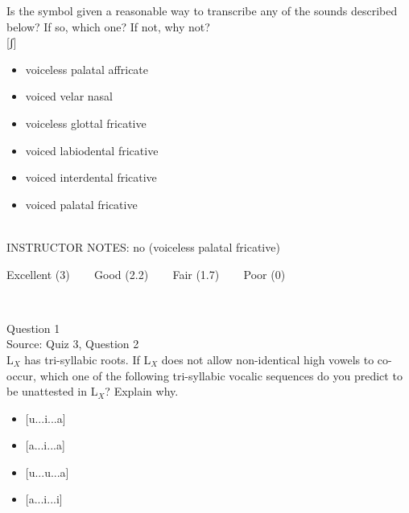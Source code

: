 \documentclass[12pt]{article}
\begin{document}
Is the symbol given a reasonable way to transcribe any of the sounds described below? If so, which one? If not, why not?\\

{[ʃ]}

\begin{itemize} \item voiceless palatal affricate \item voiced velar nasal \item voiceless glottal fricative \item voiced labiodental fricative \item voiced interdental fricative \item voiced palatal fricative \end{itemize}


~\\
INSTRUCTOR NOTES: no (voiceless palatal fricative)


\vfill
Excellent (3) ~~~ Good (2.2) ~~~ Fair (1.7) ~~~ Poor (0)
\newpage

\begin{center}
\textbf{{\color{red}{\HUGE END OF EXAM}}}\\

\end{center}
\newpage

\begin{center}
\textbf{{\color{blue}{\HUGE START OF EXAM\\}}}

\textbf{{\color{blue}{\HUGE Student ID: 6948\\}}}

\textbf{{\color{blue}{\HUGE 4:45 - 5:00 PM\\}}}

\end{center}
\newpage

{\large Question 1}\\

Source: Quiz 3, Question 2\\

L$_X$ has tri-syllabic roots. If L$_X$ does not allow non-identical high vowels to co-occur, which one of the following tri-syllabic vocalic sequences do you predict to be unattested in L$_X$? Explain why.\\

\begin{itemize} \item {[u...i...a]} \item {[a...i...a]} \item {[u...u...a]} \item {[a...i...i]} \end{itemize}
\end{document}
